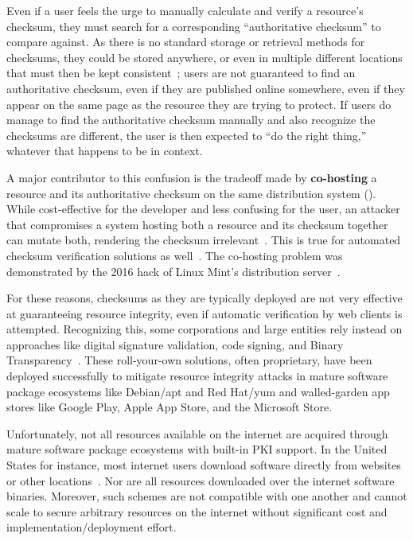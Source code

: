 Even if a user feels the urge to manually calculate and verify a resource's
checksum, they must search for a corresponding ``authoritative checksum'' to
compare against. As there is no standard storage or retrieval methods for
checksums, they could be stored anywhere, or even in multiple different
locations that must then be kept consistent~\cite{Cherubini}; users are not
guaranteed to find an authoritative checksum, even if they are published online
somewhere, even if they appear on the same page as the resource they are trying
to protect. If users do manage to find the authoritative checksum manually and
also recognize the checksums are different, the user is then expected to ``do
the right thing,'' whatever that happens to be in context.

A major contributor to this confusion is the tradeoff made by
\textbf{co-hosting} a resource and its authoritative checksum on the same
distribution system (). While cost-effective for
the developer and less confusing for the user, an attacker that compromises a
system hosting both a resource and its checksum together can mutate both,
rendering the checksum irrelevant~\cite{Stickler}. This is true for automated
checksum verification solutions as well~\cite{Cherubini}. The co-hosting problem
was demonstrated by the 2016 hack of Linux Mint's distribution
server~\cite{SCA-MINT1, SCA-MINT2}.

For these reasons, checksums as they are typically deployed are not very
effective at guaranteeing resource integrity, even if automatic verification by
web clients is attempted. Recognizing this, some corporations and large entities
rely instead on approaches like digital signature validation, code signing, and
Binary Transparency~\cite{PKI, BinaryTransparency}. These roll-your-own
solutions, often proprietary, have been deployed successfully to mitigate
resource integrity attacks in mature software package ecosystems like Debian/apt
and Red Hat/yum and walled-garden app stores like Google Play, Apple App Store,
and the Microsoft Store.

Unfortunately, not all resources available on the internet are acquired through
mature software package ecosystems with built-in PKI support. In the United
States for instance, most internet users download software directly from
websites or other locations~\cite{Cherubini, Ryan}. Nor are all resources
downloaded over the internet software binaries. Moreover, such schemes are not
compatible with one another and cannot scale to secure arbitrary resources on
the internet without significant cost and implementation/deployment effort.


